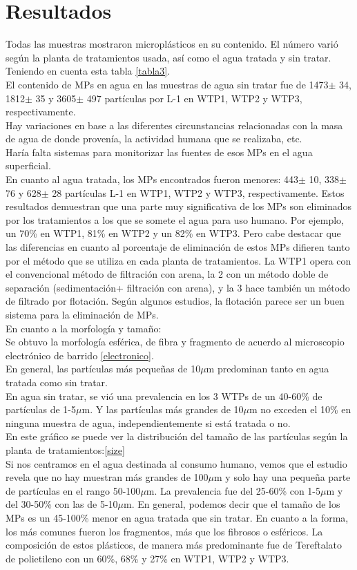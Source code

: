 \documentclass[a4paper,11pt]{article}
\begin{document}
\section{Resultados}
	Todas las muestras mostraron microplásticos en su contenido. El número varió según la planta de tratamientos usada, así como el agua tratada y sin tratar.\\
	Teniendo en cuenta esta tabla \ref{tabla3}.\\ 
	El contenido de MPs en agua en las muestras de agua sin tratar fue de 1473$\pm$ 34, 1812$\pm$ 35 y 3605$\pm$ 497 partículas por L-1 en WTP1, WTP2 y WTP3, respectivamente.\\
	Hay variaciones en base a las diferentes circunstancias relacionadas con la masa de agua de donde provenía, la actividad humana que se realizaba, etc.\\
	Haría falta sistemas para monitorizar las fuentes de esos MPs en el agua superficial.\\
	En cuanto al agua tratada, los MPs encontrados fueron menores: 443$\pm$ 10, 338$\pm$ 76 y 628$\pm$ 28 partículas L-1 en WTP1, WTP2 y WTP3, respectivamente.
	Estos resultados demuestran que una parte muy significativa de los MPs son eliminados por los tratamientos a los que se somete el agua para uso humano. Por ejemplo, un 70\% en WTP1, 81\% en WTP2 y un 82\% en WTP3. Pero cabe destacar que las diferencias en cuanto al porcentaje de eliminación de estos MPs difieren tanto por el método que se utiliza en cada planta de tratamientos. La WTP1 opera con el convencional método de filtración con arena, la 2 con un método doble de separación (sedimentación+ filtración con arena), y la 3 hace también un método de filtrado por flotación. Según algunos estudios, la flotación parece ser un buen sistema para la eliminación de MPs.\\
	En cuanto a la morfología y tamaño:\\
	Se obtuvo la morfología esférica, de fibra y fragmento de acuerdo al microscopio electrónico de barrido \ref{electronico}.\\
	En general, las partículas más pequeñas de 10$\mu$m predominan tanto en agua tratada como sin tratar.\\
	En agua sin tratar, se vió una prevalencia en los 3 WTPs de un 40-60\% de partículas de 1-5$\mu$m. Y las partículas más grandes de 10$\mu$m no exceden el 10\% en ninguna muestra de agua, independientemente si está tratada o no.\\
	En este gráfico se puede ver la distribución del tamaño de las partículas según la planta de tratamientos:\ref{size}\\
	Si nos centramos en el agua destinada al consumo humano, vemos que el estudio revela que no hay muestran más grandes de 100$\mu$m y solo hay una pequeña parte de partículas en el rango 50-100$\mu$m. La prevalencia fue del 25-60\% con 1-5$\mu$m y del 30-50\% con las de 5-10$\mu$m.
	En general, podemos decir que el tamaño de los MPs es un 45-100\% menor en agua tratada que sin tratar.
	En cuanto a la forma, los más comunes fueron los fragmentos, más que los fibrosos o esféricos.
	La composición de estos plásticos, de manera más predominante fue de Tereftalato de polietileno con un 60\%, 68\% y 27\% en WTP1, WTP2 y WTP3.
\end{document}
